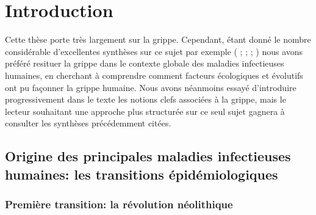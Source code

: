  
\chapter{Introduction}
\label{sec:intro}


Cette thèse porte très largement sur la grippe. Cependant, étant donné
le nombre considérable d'excellentes synthèses sur ce sujet par
exemple (\citet{Webster1992} ; \citet{Earn2002} ; \citet{Cox2000a} ;
\citet{Nelson2007}) nous avons préféré resituer la grippe dans le
contexte globale des maladies infectieuses humaines, en cherchant à
comprendre comment facteurs écologiques et évolutifs ont pu façonner
la grippe humaine. Nous avons néanmoins essayé d'introduire
progressivement dans le texte les notions clefs associées à la grippe,
mais le lecteur souhaitant une approche plus structurée sur ce seul
sujet gagnera à consulter les synthèses précédemment citées.

\section{Origine des principales maladies infectieuses humaines: les
  transitions épidémiologiques}


\subsection{Première transition: la révolution néolithique}


%

